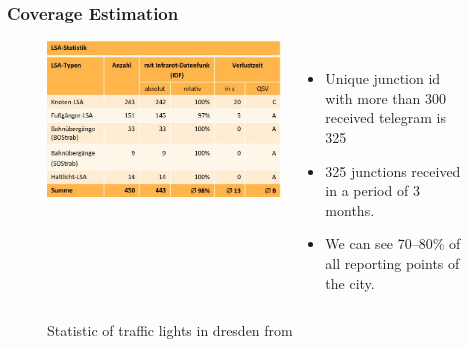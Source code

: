 
\begin{frame}
\frametitle{Coverage Estimation}

\begin{figure}
\begin{columns}
\begin{center}
  \includegraphics[height=0.6\textheight]{figs/urbic_stops_dresden.jpg}
  \caption{Statistic of traffic lights in dresden from }
\end{center}
\raggedright
\vspace{0.5cm}

\begin{itemize}
  \item Unique junction id with more than 300 received telegram is 325
  \item 325 junctions received in a period of 3 months.
  \item We can see 70--80\% of all reporting points of the city.
\end{itemize}

\end{columns}
\end{figure}

\end{frame}


